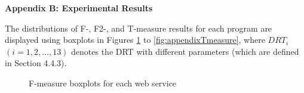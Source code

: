 \documentclass[10pt,journal,cspaper,compsoc,onecolumn]{IEEEtran}
\begin{document}
\large{\textbf{Appendix B: Experimental Results}}

The distributions of F-, F2-, and T-measure results for each program are displayed using boxplots in Figures \ref{fig:appendixFmeasure} to \ref{fig:appendixTmeasure}, where $DRT_i$ $(i = 1,2, \ldots, 13)$ denotes the DRT with different parameters (which are defined in Section 4.4.3).

\begin{figure}[h]
	\centering
	\caption{F-measure boxplots for each web service}
	\label{fig:appendixFmeasure}
\end{figure}
\end{document}
